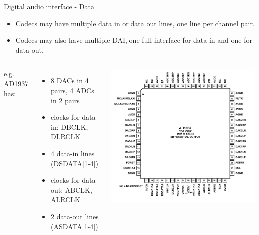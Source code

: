 \begin{frame}[fragile]{Digital audio interface - Data}
  \begin{itemize}
  \item Codecs may have multiple data in or data out lines, one line
    per channel pair.
  \item Codecs may also have multiple DAI, one full interface for data
    in and one for data out.
  \end{itemize}
  \begin{columns}
    e.g. AD1937 has:
    \begin{itemize}
    \item 8 DACs in 4 pairs, 4 ADCs in 2 pairs
    \item clocks for data-in: DBCLK, DLRCLK
    \item 4 data-in lines (DSDATA[1-4])
    \item clocks for data-out: ABCLK, ALRCLK
    \item 2 data-out lines (ASDATA[1-4])
    \end{itemize}
    \includegraphics[width=\textwidth]{slides/audio-hardware/ad1937.pdf}\\
  \end{columns}
\end{frame}

